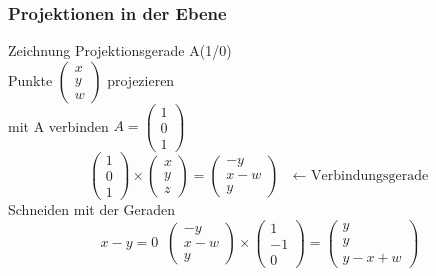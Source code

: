 \documentclass[11pt]{article}
\begin{document}
\subsubsection{Projektionen in der Ebene}
{\color{red}Zeichnung Projektionsgerade } A(1/0)\\
Punkte $\begin{pmatrix}
x \\ y \\ w
\end{pmatrix}$ projezieren\\
mit A verbinden $A = \begin{pmatrix} 1 \\ 0 \\ 1 \end{pmatrix}$
$$
\begin{pmatrix} 1 \\ 0 \\ 1 \end{pmatrix}
\times
\begin{pmatrix} x \\ y \\ z \end{pmatrix}
=
\begin{pmatrix} -y \\ x-w \\ y \end{pmatrix}
 \text{ $\leftarrow $ Verbindungsgerade} $$
Schneiden mit der Geraden 
$$ x-y = 0 \;\; 
\begin{pmatrix} -y \\ x-w \\ y \end{pmatrix}
\times
\begin{pmatrix} 1 \\ -1 \\ 0 \end{pmatrix}
=
\begin{pmatrix} y \\ y \\ y-x+w \end{pmatrix}
$$
\end{document}
